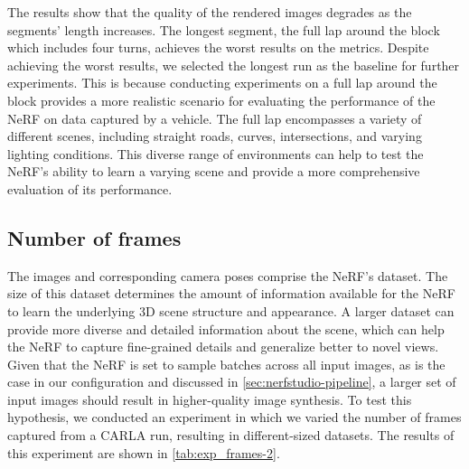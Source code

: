 

The results show that the quality of the rendered images degrades as the segments’ length increases. The longest segment, the full lap around the block which includes four turns, achieves the worst results on the metrics. Despite achieving the worst results, we selected the longest run as the baseline for further experiments. This is because conducting experiments on a full lap around the block provides a more realistic scenario for evaluating the performance of the NeRF on data captured by a vehicle. The full lap encompasses a variety of different scenes, including straight roads, curves, intersections, and varying lighting conditions. This diverse range of environments can help to test the NeRF’s ability to learn a varying scene and provide a more comprehensive evaluation of its performance.












\subsection{Number of frames} \label{sec:exp-number-of-frames}
The images and corresponding camera poses comprise the NeRF's dataset. The size of this dataset determines the amount of information available for the NeRF to learn the underlying 3D scene structure and appearance. A larger dataset can provide more diverse and detailed information about the scene, which can help the NeRF to capture fine-grained details and generalize better to novel views. Given that the NeRF is set to sample batches across all input images, as is the case in our configuration and discussed in \autoref{sec:nerfstudio-pipeline}, a larger set of input images should result in higher-quality image synthesis. To test this hypothesis, we conducted an experiment in which we varied the number of frames captured from a CARLA run, resulting in different-sized datasets. The results of this experiment are shown in \autoref{tab:exp_frames-2}.

